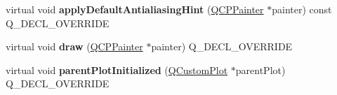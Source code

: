 \begin{DoxyCompactItemize}
\item 
virtual void {\bfseries apply\+Default\+Antialiasing\+Hint} (\hyperlink{class_q_c_p_painter}{Q\+C\+P\+Painter} $\ast$painter) const Q\+\_\+\+D\+E\+C\+L\+\_\+\+O\+V\+E\+R\+R\+I\+DE\hypertarget{class_q_c_p_layout_element_a0a8f18141bcf46cf40ad4c13324ff346}{}\label{class_q_c_p_layout_element_a0a8f18141bcf46cf40ad4c13324ff346}

\item 
virtual void {\bfseries draw} (\hyperlink{class_q_c_p_painter}{Q\+C\+P\+Painter} $\ast$painter) Q\+\_\+\+D\+E\+C\+L\+\_\+\+O\+V\+E\+R\+R\+I\+DE\hypertarget{class_q_c_p_layout_element_ad1c597b1d608cfdd86e7b76819a94cfb}{}\label{class_q_c_p_layout_element_ad1c597b1d608cfdd86e7b76819a94cfb}

\item 
virtual void {\bfseries parent\+Plot\+Initialized} (\hyperlink{class_q_custom_plot}{Q\+Custom\+Plot} $\ast$parent\+Plot) Q\+\_\+\+D\+E\+C\+L\+\_\+\+O\+V\+E\+R\+R\+I\+DE\hypertarget{class_q_c_p_layout_element_aa4e9a1488b6929588829846a46243dc6}{}\label{class_q_c_p_layout_element_aa4e9a1488b6929588829846a46243dc6}

\end{DoxyCompactItemize}
